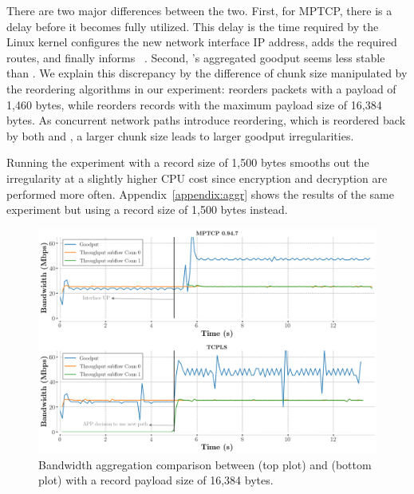 There are two major differences between
the two. First, for MPTCP, there is a delay before it becomes fully utilized. 
This delay is the time required by the Linux kernel
configures the new network interface IP address, adds the required routes, and
finally informs \mptcp~\cite{paasch2012exploring}.
Second, \tcpls's aggregated goodput seems less stable than \mptcp. We explain 
this discrepancy by the difference of chunk size manipulated by the reordering 
algorithms in our experiment: \mptcp reorders packets with a payload of 1,460 
bytes, while \tcpls reorders records with the maximum 
payload size of 16,384 bytes. As concurrent network paths introduce reordering, 
which is reordered back by both \mptcp and \tcpls, a larger chunk size 
leads to larger goodput irregularities. 

Running the experiment with a record size 
of 1,500 bytes smooths out the irregularity at a slightly higher CPU cost since 
encryption and decryption are performed more often.
Appendix~\ref{appendix:aggr} shows the results of the same experiment but using
a \tls record size of 1,500 bytes instead.


\begin{figure}[!t]
  \begin{center}
    \includegraphics[width=\columnwidth]{figures/aggregate_dual.png}
  \end{center}
\vspace{-0.5cm}
  \caption{Bandwidth aggregation comparison between \mptcp (top plot) and
    \tcpls (bottom plot) with a record payload size of 16,384 bytes.}
  \label{fig:multipath_aggregation}
\end{figure}

